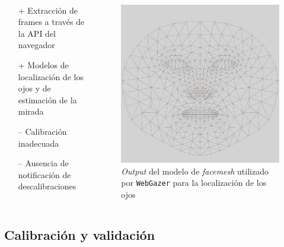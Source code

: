 \documentclass[aspectratio=169]{beamer}
\begin{document}
\begin{frame}{~}

  \begin{columns}
    \begin{column}{.4\textwidth}
      \begin{itemize}
        \item[+] Extracción de frames a través de la API del navegador
        \item[+] Modelos de localización de los ojos y de estimación de la
          mirada
        \item[--] Calibración inadecuada
        \item[--] Ausencia de notificación de descalibraciones
      \end{itemize}
    \end{column}

    \begin{column}{.6\textwidth}
      \begin{figure}
        \includegraphics[width=0.6\linewidth]{img/facemesh-kepyoints.jpg}
        \caption{\textit{Output} del modelo de \textit{facemesh} utilizado por
        \texttt{WebGazer} para la localización de los ojos}
      \end{figure}
    \end{column}
  \end{columns}

\end{frame}

\subsection{Calibración y validación}
\end{document}
